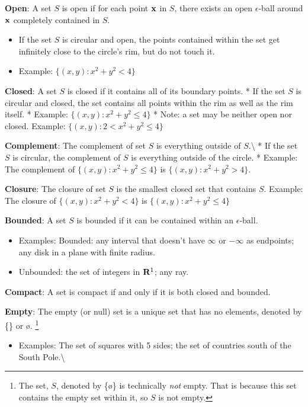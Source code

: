 \documentclass[]{book}
\providecommand{\tightlist}{%
  \setlength{\itemsep}{0pt}\setlength{\parskip}{0pt}}
\let\rmarkdownfootnote\footnote%
\def\footnote{\protect\rmarkdownfootnote}
\theoremstyle{definition}
\theoremstyle{definition}
\theoremstyle{definition}
\theoremstyle{remark}
\begin{document}
\textbf{Open}: A set \(S\) is open if for each point \(\bf x\) in \(S\),
there exists an open \(\epsilon\)-ball around \(\bf x\) completely
contained in \(S\).

\begin{itemize}
\tightlist
\item
  If the set \(S\) is circular and open, the points contained within the
  set get infinitely close to the circle's rim, but do not touch it.
\item
  Example: \(\{ (x,y) : x^2+y^2<4 \}\)
\end{itemize}

\textbf{Closed}: A set \(S\) is closed if it contains all of its
boundary points. * If the set \(S\) is circular and closed, the set
contains all points within the rim as well as the rim itself. * Example:
\(\{ (x,y) : x^2+y^2\le 4 \}\) * Note: a set may be neither open nor
closed. Example: \(\{ (x,y) : 2 < x^2+y^2\le 4 \}\)

\textbf{Complement}: The complement of set \(S\) is everything outside
of \(S\).\textbackslash{} * If the set \(S\) is circular, the complement
of \(S\) is everything outside of the circle. * Example: The complement
of \(\{ (x,y) : x^2+y^2\le 4 \}\) is \(\{ (x,y) : x^2+y^2 > 4 \}\).

\textbf{Closure}: The closure of set \(S\) is the smallest closed set
that contains \(S\). Example: The closure of \(\{ (x,y) : x^2+y^2<4 \}\)
is \(\{ (x,y) : x^2+y^2\le 4 \}\)

\textbf{Bounded}: A set \(S\) is bounded if it can be contained within
an \(\epsilon\)-ball.

\begin{itemize}
\tightlist
\item
  Examples: Bounded: any interval that doesn't have \(\infty\) or
  \(-\infty\) as endpoints; any disk in a plane with finite radius.
\item
  Unbounded: the set of integers in \({\bf R}^1\); any ray.
\end{itemize}

\textbf{Compact}: A set is compact if and only if it is both closed and
bounded.

\textbf{Empty}: The empty (or null) set is a unique set that has no
elements, denoted by \{\} or \o.
\footnote{The set, $S$, denoted by \{\o \} is technically \emph{not} empty. That is because this set contains the empty set within it, so $S$ is not empty.}

\begin{itemize}
\tightlist
\item
  Examples: The set of squares with 5 sides; the set of countries south
  of the South Pole.\textbackslash{}
\end{itemize}
\end{document}
